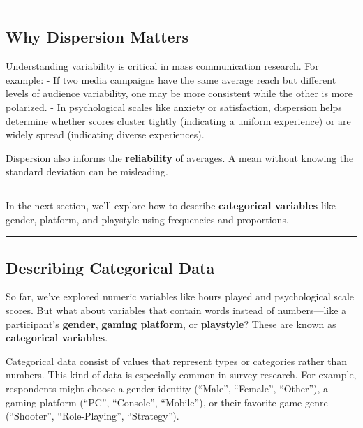 \documentclass[
]{book}
\begin{document}
\begin{center}\rule{0.5\linewidth}{0.5pt}\end{center}

\subsection*{Why Dispersion Matters}\label{why-dispersion-matters}

Understanding variability is critical in mass communication research. For example: - If two media campaigns have the same average reach but different levels of audience variability, one may be more consistent while the other is more polarized. - In psychological scales like anxiety or satisfaction, dispersion helps determine whether scores cluster tightly (indicating a uniform experience) or are widely spread (indicating diverse experiences).

Dispersion also informs the \textbf{reliability} of averages. A mean without knowing the standard deviation can be misleading.

\begin{center}\rule{0.5\linewidth}{0.5pt}\end{center}

In the next section, we'll explore how to describe \textbf{categorical variables} like gender, platform, and playstyle using frequencies and proportions.

\begin{center}\rule{0.5\linewidth}{0.5pt}\end{center}

\subsection*{\texorpdfstring{\textbf{Describing Categorical Data}}{Describing Categorical Data}}\label{describing-categorical-data}

So far, we've explored numeric variables like hours played and psychological scale scores. But what about variables that contain words instead of numbers---like a participant's \textbf{gender}, \textbf{gaming platform}, or \textbf{playstyle}? These are known as \textbf{categorical variables}.

Categorical data consist of values that represent types or categories rather than numbers. This kind of data is especially common in survey research. For example, respondents might choose a gender identity (``Male'', ``Female'', ``Other''), a gaming platform (``PC'', ``Console'', ``Mobile''), or their favorite game genre (``Shooter'', ``Role-Playing'', ``Strategy'').
\end{document}

